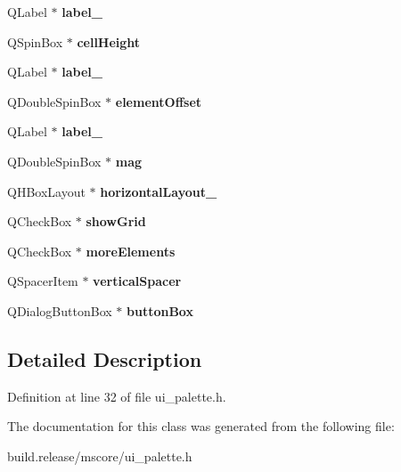 \begin{DoxyCompactItemize}
Q\+Label $\ast$ {\bfseries label\+\_}
\item 
\mbox{\label{class_ui___palette_properties_a1b553e51b55d6ded56ac887b5cb519d6}} 
Q\+Spin\+Box $\ast$ {\bfseries cell\+Height}
\item 
\mbox{\label{class_ui___palette_properties_a9f4e73c614e1b7d8926dbc67d9469d17}} 
Q\+Label $\ast$ {\bfseries label\+\_}
\item 
\mbox{\label{class_ui___palette_properties_ab8bd6b547edcda0b14d7a1a920682eb2}} 
Q\+Double\+Spin\+Box $\ast$ {\bfseries element\+Offset}
\item 
\mbox{\label{class_ui___palette_properties_adfc984092994133e4f2768489ef08f82}} 
Q\+Label $\ast$ {\bfseries label\+\_}
\item 
\mbox{\label{class_ui___palette_properties_a450be9a12e799d1a8fdad6f3cb9b466c}} 
Q\+Double\+Spin\+Box $\ast$ {\bfseries mag}
\item 
\mbox{\label{class_ui___palette_properties_ae68aa473a34342f66dd547825c268d79}} 
Q\+H\+Box\+Layout $\ast$ {\bfseries horizontal\+Layout\+\_}
\item 
\mbox{\label{class_ui___palette_properties_a6db41cbdb318688becb309ba8facc3e6}} 
Q\+Check\+Box $\ast$ {\bfseries show\+Grid}
\item 
\mbox{\label{class_ui___palette_properties_aa180c0a5c06bc4448c5722bd80769e4a}} 
Q\+Check\+Box $\ast$ {\bfseries more\+Elements}
\item 
\mbox{\label{class_ui___palette_properties_a735f37f74371ff546f678f4a5ebc77f5}} 
Q\+Spacer\+Item $\ast$ {\bfseries vertical\+Spacer}
\item 
\mbox{\label{class_ui___palette_properties_ad56a13c51013da28acbc7567d78aa2ed}} 
Q\+Dialog\+Button\+Box $\ast$ {\bfseries button\+Box}
\end{DoxyCompactItemize}


\subsection{Detailed Description}


Definition at line 32 of file ui\+\_\+palette.\+h.



The documentation for this class was generated from the following file\+:\begin{DoxyCompactItemize}
\item 
build.\+release/mscore/ui\+\_\+palette.\+h\end{DoxyCompactItemize}

